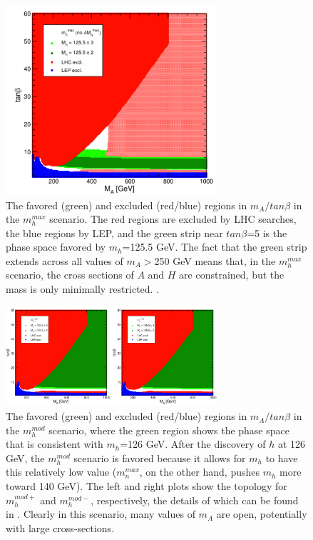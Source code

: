 \begin{figure}
	\centering
	\includegraphics[width=0.7\textwidth]{Theory/figures/mh_max.pdf}
	\caption{The favored (green) and excluded (red/blue) regions in $m_A/tan\beta$ in the $m_h^{max}$ scenario.  The red regions are excluded by LHC searches, the blue regions by LEP, and the green strip near $tan\beta$=5 is the phase space favored by $m_h$=125.5 GeV.  The fact that the green strip extends across all values of $m_A>$250 GeV means that, in the $m_h^{max}$ scenario, the cross sections of $A$ and $H$ are constrained, but the mass is only minimally restricted. \cite{Carena-2}. \label{fig:mh_max}}
\end{figure}


\begin{figure}
	\centering
	\includegraphics[width=0.7\textwidth]{Theory/figures/mh_mod.pdf}
	\caption{The favored (green) and excluded (red/blue) regions in $m_A/tan\beta$ in the $m_h^{mod}$ scenario, where the green region shows the phase space that is consistent with $m_h$=126 GeV.  After the discovery of $h$ at 126 GeV, the $m_h^{mod}$ scenario is favored because it allows for $m_h$ to have this relatively low value ($m_n^{max}$, on the other hand, pushes $m_h$ more toward 140 GeV).  The left and right plots show the topology for $m_h^{mod+}$ and $m_h^{mod-}$, respectively, the details of which can be found in \cite{Carena-2}. Clearly in this scenario, many values of $m_A$ are open, potentially with large cross-sections. \label{fig:mh_mod}}
\end{figure}





